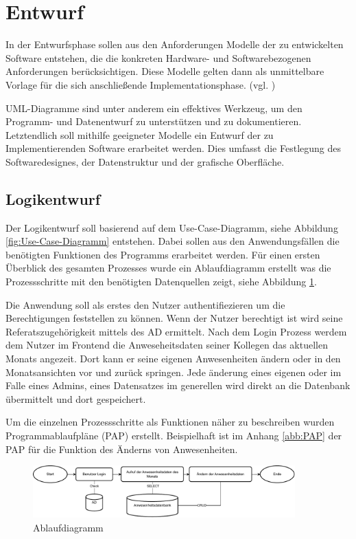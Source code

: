\section{Entwurf}
\label{sec:Entwurf}
In der Entwurfsphase sollen aus den Anforderungen Modelle der zu entwickelten Software entstehen, die die konkreten Hardware- und Softwarebezogenen Anforderungen berücksichtigen. Diese Modelle gelten dann als unmittelbare Vorlage für die sich anschließende Implementationsphase. (vgl. \cite[S. 69]{dumke-2003})

UML-Diagramme sind unter anderem ein effektives Werkzeug, um den Programm- und Datenentwurf zu unterstützen und zu dokumentieren. Letztendlich soll mithilfe geeigneter Modelle ein Entwurf der zu Implementierenden Software erarbeitet werden. Dies umfasst die Festlegung des Softwaredesignes, der Datenstruktur und der grafische Oberfläche.

\subsection{Logikentwurf}
\label{sec:Logikentwurf}
Der Logikentwurf soll basierend auf dem Use-Case-Diagramm, siehe Abbildung \ref*{fig:Use-Case-Diagramm} entstehen. Dabei sollen aus den Anwendungsfällen die benötigten Funktionen des Programms erarbeitet werden. Für einen ersten Überblick des gesamten Prozesses wurde ein Ablaufdiagramm erstellt was die Prozessschritte mit den benötigten Datenquellen zeigt, siehe Abbildung \ref*{abb:Flow}.

Die Anwendung soll als erstes den Nutzer authentifiezieren um die Berechtigungen feststellen zu können. Wenn der Nutzer berechtigt ist wird seine Referatszugehörigkeit mittels des AD ermittelt. Nach dem Login Prozess werdem dem Nutzer im Frontend die Anweseheitsdaten seiner Kollegen das aktuellen Monats angezeit. Dort kann er seine eigenen Anwesenheiten ändern oder in den Monatsansichten vor und zurück springen. Jede änderung eines eigenen oder im Falle eines Admins, eines Datensatzes im generellen wird direkt an die Datenbank übermittelt und dort gespeichert.

Um die einzelnen Prozessschritte als Funktionen näher zu beschreiben wurden Programmablaufpläne (PAP) erstellt. Beispielhaft ist im Anhang \ref{abb:PAP} der PAP für die Funktion des Änderns von Anwesenheiten.

\begin{figure}[htb]
    \centering
    \includegraphics[width=0.9\textwidth,angle=0]{abb/Flow-Diagramm.drawio.pdf}
    \caption[Beschreibung]{Ablaufdiagramm}
    \label{abb:Flow}
\end{figure}




